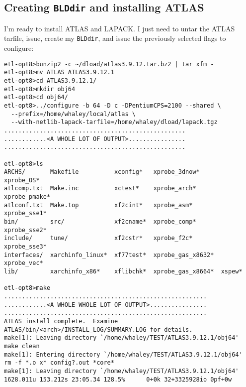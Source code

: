 \documentclass[11pt]{article}
\begin{document}
\subsection{Creating {\tt BLDdir} and installing ATLAS}
\label{sec-ex-install}
I'm ready to install ATLAS and LAPACK.  I just need to untar the
ATLAS tarfile, issue, create my {\tt BLDdir}, and issue the
previously selected flags to configure:
\vspace*{-0.1in}
\begin{footnotesize}
\begin{verbatim}
etl-opt8>bunzip2 -c ~/dload/atlas3.9.12.tar.bz2 | tar xfm -
etl-opt8>mv ATLAS ATLAS3.9.12.1   
etl-opt8>cd ATLAS3.9.12.1/
etl-opt8>mkdir obj64
etl-opt8>cd obj64/
etl-opt8>../configure -b 64 -D c -DPentiumCPS=2100 --shared \
  --prefix=/home/whaley/local/atlas \
  --with-netlib-lapack-tarfile=/home/whaley/dload/lapack.tgz   
...................................................
............<A WHOLE LOT OF OUTPUT>................
...................................................

etl-opt8>ls
ARCHS/       Makefile          xconfig*   xprobe_3dnow*      xprobe_OS*
atlcomp.txt  Make.inc          xctest*    xprobe_arch*       xprobe_pmake*
atlconf.txt  Make.top          xf2cint*   xprobe_asm*        xprobe_sse1*
bin/         src/              xf2cname*  xprobe_comp*       xprobe_sse2*
include/     tune/             xf2cstr*   xprobe_f2c*        xprobe_sse3*
interfaces/  xarchinfo_linux*  xf77test*  xprobe_gas_x8632*  xprobe_vec*
lib/         xarchinfo_x86*    xflibchk*  xprobe_gas_x8664*  xspew*

etl-opt8>make
.........................................................
............<A WHOLE WHOLE LOT OF OUTPUT>................
.........................................................
ATLAS install complete.  Examine
ATLAS/bin/<arch>/INSTALL_LOG/SUMMARY.LOG for details.
make[1]: Leaving directory `/home/whaley/TEST/ATLAS3.9.12.1/obj64'
make clean
make[1]: Entering directory `/home/whaley/TEST/ATLAS3.9.12.1/obj64'
rm -f *.o x* config?.out *core*
make[1]: Leaving directory `/home/whaley/TEST/ATLAS3.9.12.1/obj64'
1628.011u 153.212s 23:05.34 128.5%      0+0k 32+3325928io 0pf+0w
\end{verbatim}
\end{footnotesize}
\end{document}
